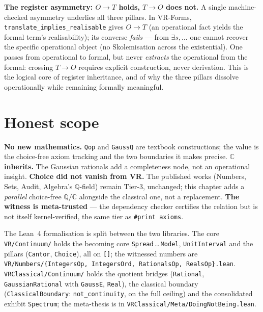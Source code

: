 \textbf{The register asymmetry: $O\to T$ holds, $T\to O$ does not.}  A single machine-checked
asymmetry underlies all three pillars.  In VR-Forms, \texttt{translate\_implies\_realisable}
gives $O\to T$ (an operational fact yields the formal term's realisability); its converse
\emph{fails} --- from $\exists s,\dots$ one cannot recover the specific operational object (no
Skolemisation across the existential).  One passes from operational to formal, but never
\emph{extracts} the operational from the formal: crossing $T\to O$ requires explicit
construction, never derivation.  This is the logical core of register inheritance, and of why
the three pillars dissolve operationally while remaining formally meaningful.

\section{Honest scope}
\label{sec:continuum_scope}

\textbf{No new mathematics.}  \texttt{Qop} and \texttt{GaussQ} are textbook
constructions; the value is the choice-free axiom tracking and the two boundaries it
makes precise.  \textbf{$\mathbb{C}$ inherits.}  The Gaussian rationals add a
completeness node, not an operational insight.  \textbf{Choice did not vanish from VR.}
The published works (Numbers, Sets, Audit, Algebra's $\mathbb{Q}$-field) remain Tier-3,
unchanged; this chapter adds a \emph{parallel} choice-free $\mathbb{Q}/\mathbb{C}$
alongside the classical one, not a replacement.  \textbf{The witness is meta-trusted}
--- the dependency checker certifies the relation but is not itself kernel-verified, the
same tier as \texttt{\#print axioms}.

The Lean~4 formalisation is split between the two libraries.  The core
\texttt{VR/Continuum/} holds the becoming core \texttt{Spread}\,\dots\,\texttt{Model},
\texttt{UnitInterval} and the pillars (\texttt{Cantor}, \texttt{Choice}), all on
\texttt{[]}; the witnessed numbers are \texttt{VR/Numbers/\{IntegersOp, IntegersOrd,
RationalsOp, RealsOp\}.lean}.  \texttt{VRClassical/Continuum/} holds the quotient bridges
(\texttt{Rational}, \texttt{GaussianRational} with \texttt{GaussE}, \texttt{Real}), the
classical boundary (\texttt{ClassicalBoundary}: \texttt{not\_continuity}, on the full
ceiling) and the consolidated exhibit \texttt{Spectrum}; the meta-thesis is in
\texttt{VRClassical/Meta/DoingNotBeing.lean}.
